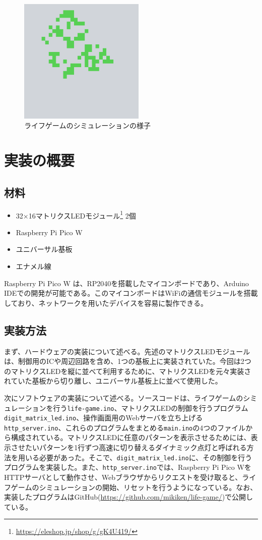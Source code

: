 \documentclass{jlreq}
\begin{document}
\begin{figure}[h]
    \begin{center}
        \includegraphics[width=60mm]{img/lifegame.png}
    \end{center}
    \caption{ライフゲームのシミュレーションの様子}
    \label{img:lifegame}
\end{figure}

\section{実装の概要}
\subsection{材料}
\begin{itemize}
    \item 32×16マトリクスLEDモジュール\footnote{\url{https://eleshop.jp/shop/g/gK4U419/}} 2個
    \item Raspberry Pi Pico W
    \item ユニバーサル基板
    \item エナメル線
\end{itemize}
Raspberry Pi Pico W は、RP2040を搭載したマイコンボードであり、Arduino IDEでの開発が可能である。このマイコンボードはWiFiの通信モジュールを搭載しており、ネットワークを用いたデバイスを容易に製作できる。

\subsection{実装方法}
まず、ハードウェアの実装について述べる。先述のマトリクスLEDモジュールは、制御用のICや周辺回路を含め、1つの基板上に実装されていた。今回は2つのマトリクスLEDを縦に並べて利用するために、マトリクスLEDを元々実装されていた基板から切り離し、ユニバーサル基板上に並べて使用した。

次にソフトウェアの実装について述べる。ソースコードは、ライフゲームのシミュレーションを行う\verb|life-game.ino|、マトリクスLEDの制御を行うプログラム\verb|digit_matrix_led.ino|、操作画面用のWebサーバを立ち上げる\verb|http_server.ino|、これらのプログラムをまとめる\verb|main.ino|の4つのファイルから構成されている。マトリクスLEDに任意のパターンを表示させるためには、表示させたいパターンを1行ずつ高速に切り替えるダイナミック点灯と呼ばれる方法を用いる必要があった。そこで、\verb|digit_matrix_led.ino|に、その制御を行うプログラムを実装した。また、\verb|http_server.ino|では、Raspberry Pi Pico WをHTTPサーバとして動作させ、Webブラウザからリクエストを受け取ると、ライフゲームのシミュレーションの開始、リセットを行うようになっている。なお、実装したプログラムはGitHub(\url{https://github.com/mikiken/life-game/})で公開している。
\end{document}
